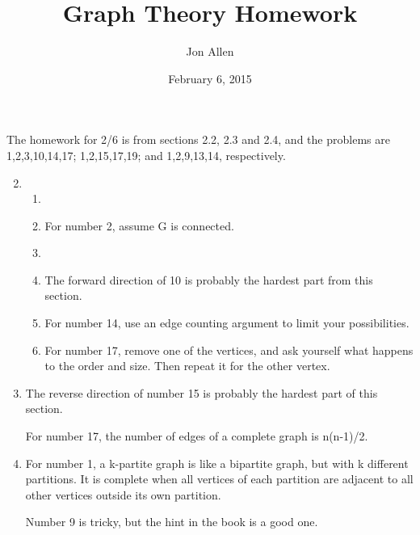 \documentclass[letterpaper]{article}
\begin{document}
\title{Graph Theory Homework}
\date{February 6, 2015}
\author{Jon Allen}
\maketitle
The homework for 2/6 is from sections 2.2, 2.3 and 2.4, and the problems are 1,2,3,10,14,17; 1,2,15,17,19; and 1,2,9,13,14, respectively.
\renewcommand{\labelenumi}{2.\arabic{enumi}}
\renewcommand{\labelenumii}{\arabic{enumii}.}
\renewcommand{\labelenumiii}{(\alph{enumiii})}
\begin{enumerate}
\setcounter{enumi}{1}
\item
  \begin{enumerate}
  \item
  \item
    For number 2, assume G is connected.
  \item
  \setcounter{enumii}{9}
  \item
    The forward direction of 10 is probably the hardest part from this section.
  \setcounter{enumii}{13}
  \item
    For number 14, use an edge counting argument to limit your possibilities.
  \setcounter{enumii}{16}
  \item
    For number 17, remove one of the vertices, and ask yourself what happens to the order and size.  Then repeat it for the other vertex.
  \end{enumerate}
\item

The reverse direction of number 15 is probably the hardest part of this section.

For number 17, the number of edges of a complete graph is n(n-1)/2.

\item

For number 1, a k-partite graph is like a bipartite graph, but with k different partitions.  It is complete when all vertices of each partition are adjacent to all other vertices outside its own partition.

Number 9 is tricky, but the hint in the book is a good one.
\end{enumerate}
\end{document}
